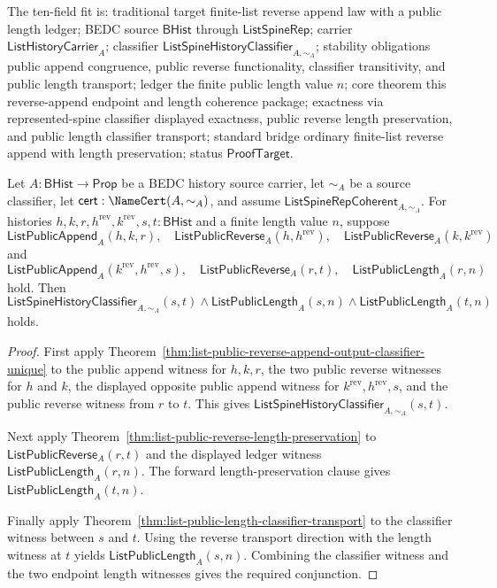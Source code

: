 \begin{theorem}
\label{thm:list-public-reverse-append-length-ledger-coherence}
The ten-field fit is: traditional target finite-list reverse append law with a
public length ledger; BEDC source $\mathsf{BHist}$ through
$\mathsf{ListSpineRep}$; carrier $\mathsf{ListHistoryCarrier}_A$; classifier
$\mathsf{ListSpineHistoryClassifier}_{A,\sim_A}$; stability obligations public
append congruence, public reverse functionality, classifier transitivity, and
public length transport; ledger the finite public length value $n$; core
theorem this reverse-append endpoint and length coherence package; exactness via
represented-spine classifier displayed exactness, public reverse length
preservation, and public length classifier transport; standard bridge ordinary
finite-list reverse append with length preservation; status
$\mathsf{ProofTarget}$.

Let $A:\mathsf{BHist}\to\mathsf{Prop}$ be a BEDC history source carrier, let
$\sim_A$ be a source classifier, let $\mathsf{cert}:\NameCert(A,\sim_A)$, and
assume $\mathsf{ListSpineRepCoherent}_{A,\sim_A}$. For histories
$h,k,r,h^{\mathrm{rev}},k^{\mathrm{rev}},s,t:\mathsf{BHist}$ and a finite
length value $n$, suppose
$$
\mathsf{ListPublicAppend}_A(h,k,r),
\quad
\mathsf{ListPublicReverse}_A(h,h^{\mathrm{rev}}),
\quad
\mathsf{ListPublicReverse}_A(k,k^{\mathrm{rev}})
$$
and
$$
\mathsf{ListPublicAppend}_A(k^{\mathrm{rev}},h^{\mathrm{rev}},s),
\quad
\mathsf{ListPublicReverse}_A(r,t),
\quad
\mathsf{ListPublicLength}_A(r,n)
$$
hold. Then
$$
\mathsf{ListSpineHistoryClassifier}_{A,\sim_A}(s,t)\land
\mathsf{ListPublicLength}_A(s,n)\land
\mathsf{ListPublicLength}_A(t,n)
$$
holds.
\end{theorem}
\begin{proof}
First apply
Theorem~\ref{thm:list-public-reverse-append-output-classifier-unique} to the
public append witness for $h,k,r$, the two public reverse witnesses for $h$ and
$k$, the displayed opposite public append witness for
$k^{\mathrm{rev}},h^{\mathrm{rev}},s$, and the public reverse witness from $r$
to $t$. This gives
$\mathsf{ListSpineHistoryClassifier}_{A,\sim_A}(s,t)$.

Next apply Theorem~\ref{thm:list-public-reverse-length-preservation} to
$\mathsf{ListPublicReverse}_A(r,t)$ and the displayed ledger witness
$\mathsf{ListPublicLength}_A(r,n)$. The forward length-preservation clause gives
$\mathsf{ListPublicLength}_A(t,n)$.

Finally apply Theorem~\ref{thm:list-public-length-classifier-transport} to the
classifier witness between $s$ and $t$. Using the reverse transport direction
with the length witness at $t$ yields $\mathsf{ListPublicLength}_A(s,n)$.
Combining the classifier witness and the two endpoint length witnesses gives
the required conjunction.
\end{proof}


